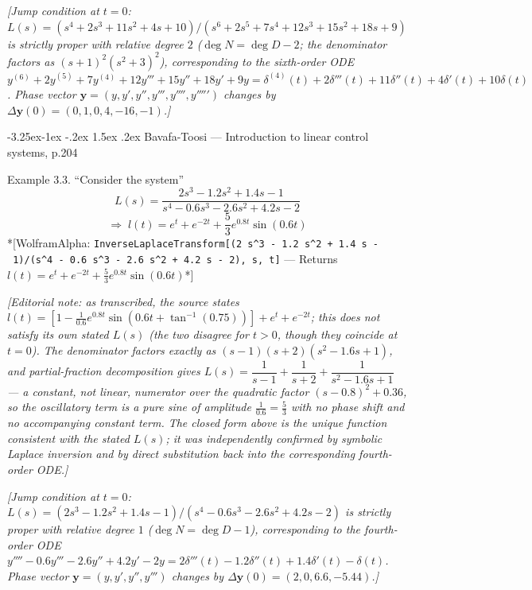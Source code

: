 \documentclass[
  11pt,
]{article}
\makeatletter
\providecommand{\implies}{\Longrightarrow}
\renewcommand\paragraph{\@startsection{paragraph}{4}{\z@}%
                                     {-3.25ex\@plus -1ex \@minus -.2ex}%
                                     {1.5ex \@plus .2ex}%
                                     {\normalfont\normalsize\bfseries}}
\makeatother
\begin{document}
\emph{{[}Jump condition at \(t=0\):
\(L(s)=(s^4+2s^3+11s^2+4s+10)/(s^6+2s^5+7s^4+12s^3+15s^2+18s+9)\) is
strictly proper with relative degree \(2\) (\(\deg N=\deg D-2\); the
denominator factors as \((s+1)^2(s^2+3)^2\)), corresponding to the
sixth-order ODE
\(y^{(6)}+2y^{(5)}+7y^{(4)}+12y'''+15y''+18y'+9y=\delta^{(4)}(t)+2\delta'''(t)+11\delta''(t)+4\delta'(t)+10\delta(t)\).
Phase vector \(\mathbf y=(y,y',y'',y''',y'''',y''''')\) changes by
\(\Delta\mathbf y(0)=(0,1,0,4,-16,-1)\).{]}}

\hypertarget{bavafa-toosi-introduction-to-linear-control-systems-p.204-1}{%
\paragraph{Bavafa-Toosi --- Introduction to linear control systems,
p.204}\label{bavafa-toosi-introduction-to-linear-control-systems-p.204-1}}

Example 3.3. ``Consider the system'' \[
L(s) = \frac{2s^3 - 1.2s^2 + 1.4s - 1}{s^4 - 0.6s^3 - 2.6s^2 + 4.2s - 2}
\] \[
\implies\; l(t) = e^{t} + e^{-2t} + \frac{5}{3}e^{0.8t}\sin(0.6t)
\] *{[}WolframAlpha:
\texttt{InverseLaplaceTransform{[}(2\ s\^{}3\ -\ 1.2\ s\^{}2\ +\ 1.4\ s\ -\ 1)/(s\^{}4\ -\ 0.6\ s\^{}3\ -\ 2.6\ s\^{}2\ +\ 4.2\ s\ -\ 2),\ s,\ t{]}}
--- Returns
\(l(t) = e^{t} + e^{-2t} + \frac{5}{3}e^{0.8t}\sin(0.6t)\)*{]}

\emph{{[}Editorial note: as transcribed, the source states
\(l(t) = \left[1 - \frac{1}{0.6}e^{0.8t}\sin\left(0.6t + \tan^{-1}(0.75)\right)\right] + e^{t} + e^{-2t}\);
this does not satisfy its own stated \(L(s)\) (the two disagree for
\(t>0\), though they coincide at \(t=0\)). The denominator factors
exactly as \((s-1)(s+2)(s^2-1.6s+1)\), and partial-fraction
decomposition gives
\(L(s)=\dfrac{1}{s-1}+\dfrac{1}{s+2}+\dfrac{1}{s^2-1.6s+1}\) --- a
constant, not linear, numerator over the quadratic factor
\((s-0.8)^2+0.36\), so the oscillatory term is a pure sine of amplitude
\(\frac{1}{0.6}=\frac53\) with no phase shift and no accompanying
constant term. The closed form above is the unique function consistent
with the stated \(L(s)\); it was independently confirmed by symbolic
Laplace inversion and by direct substitution back into the corresponding
fourth-order ODE.{]}}

\emph{{[}Jump condition at \(t=0\):
\(L(s)=(2s^3-1.2s^2+1.4s-1)/(s^4-0.6s^3-2.6s^2+4.2s-2)\) is strictly
proper with relative degree \(1\) (\(\deg N=\deg D-1\)), corresponding
to the fourth-order ODE
\(y''''-0.6y'''-2.6y''+4.2y'-2y=2\delta'''(t)-1.2\delta''(t)+1.4\delta'(t)-\delta(t)\).
Phase vector \(\mathbf y=(y,y',y'',y''')\) changes by
\(\Delta\mathbf y(0)=(2,0,6.6,-5.44)\).{]}}
\end{document}
